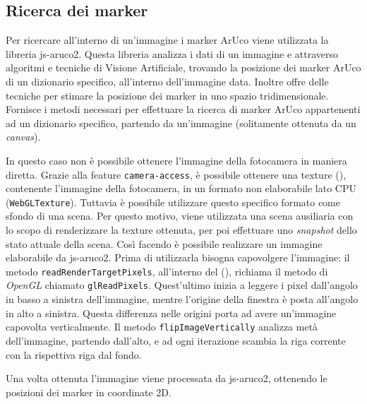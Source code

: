 \documentclass[12pt,a4paper,openright,oneside]{book}
\begin{document}
\subsection{Ricerca dei marker}\label{sub:impl_ricerca_dei_marker} %
Per ricercare all'interno di un'immagine i marker ArUco viene utilizzata la libreria js-aruco2.
Questa libreria analizza i dati di un immagine e attraverso algoritmi e tecniche di Visione Artificiale, trovando la posizione dei marker ArUco di un dizionario specifico, all'interno dell'immagine data.
Inoltre offre delle tecniche per stimare la posizione dei marker in uno spazio tridimensionale.
\\
Fornisce i metodi necessari per effettuare la ricerca di marker ArUco appartenenti ad un dizionario specifico, partendo da un'immagine (solitamente ottenuta da un \textit{canvas}).
%

%
In questo caso non è possibile ottenere l'immagine della fotocamera in maniera diretta.
Grazie alla feature \texttt{camera-access}, è possibile ottenere una texture (), contenente l'immagine della fotocamera, in un formato non elaborabile lato CPU (\texttt{WebGLTexture}).
Tuttavia è possibile utilizzare questo specifico formato come sfondo di una scena. Per questo motivo, viene utilizzata una scena ausiliaria con lo scopo di renderizzare la texture ottenuta, per poi effettuare uno \textit{snapshot} dello stato attuale della scena. Così facendo è possibile realizzare un immagine elaborabile da js-aruco2.
Prima di utilizzarla bisogna capovolgere l'immagine: il metodo \texttt{readRenderTargetPixels}, all'interno del (), richiama il metodo di \textit{OpenGL} chiamato \texttt{glReadPixels}. Quest'ultimo inizia a leggere i pixel dall'angolo in basso a sinistra dell'immagine, mentre l'origine della finestra è posta all'angolo in alto a sinistra. Questa differenza nelle origini porta ad avere un'immagine capovolta verticalmente.
Il metodo \texttt{flipImageVertically} analizza metà dell'immagine, partendo dall'alto, e ad ogni iterazione scambia la riga corrente con la rispettiva riga dal fondo.

%
Una volta ottenuta l'immagine viene processata da js-aruco2, ottenendo le posizioni dei marker in coordinate 2D.

\end{document}
